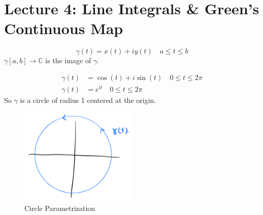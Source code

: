 \chapter{Lecture 4: Line Integrals \& Green's Continuous Map}
\begin{theorem}
    $$ \gamma (t) = x(t) + iy(t) \quad a \leq t \leq b $$
    $\gamma [a,b] \to \mathbb{C}$ is the image of $\gamma$.
\end{theorem}

\begin{example}
    \begin{align*}
        \gamma(t) & = \cos(t) + i\sin(t) \quad 0 \leq t \leq 2\pi \\
        \gamma(t) & = e^{it} \quad 0 \leq t \leq 2\pi
    \end{align*}
    So $\gamma$ is a circle of radius 1 centered at the origin.
    \begin{figure}[H]
        \centering
        \includegraphics[width=0.5\textwidth]{LECTURE_4/circle.png}
        \caption{Circle Parametrization}

    \end{figure}
\end{example}

